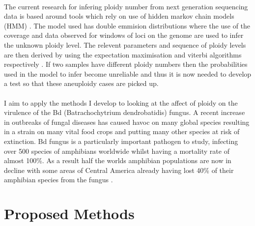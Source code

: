 \documentclass[11pt]{article}
\begin{document}
\paragraph{} The current research for infering ploidy number from next generation sequencing data is based around tools which rely on use of hidden markov chain models (HMM) \autocite{Kai2007}. The model used has double emmision distributions where the use of the coverage and data observed for windows of loci on the genome are used to infer the unknown ploidy level. The relevent parameters and sequence of ploidy levels are then derived by using the expectation maximisation and viterbi algorithms respectively \autocite{Colella2007}. If two samples have different ploidy numbers then the probabilities used in the model to infer become unreliable and thus it is now needed to develop a test so that these aneuploidy cases are picked up. 
\paragraph{} I aim to apply the methods I develop to looking at the affect of ploidy on the virulence of the Bd (Batrachochytrium dendrobatidis) fungus. A recent increase in outbreaks of fungal diseases has caused havoc on many global species resulting in a strain on many vital food crops and putting many other species at risk of extinction. Bd fungus is a particularly important pathogen to study, infecting over 500 species of amphibians worldwide whilst having a mortality rate of almost 100\%. As a result half the worlds amphibian populations are now in decline with some areas of Central America already having lost 40\% of their amphibian species from the fungus \autocite{Fisher2012}.
\section{Proposed Methods}
\end{document}
